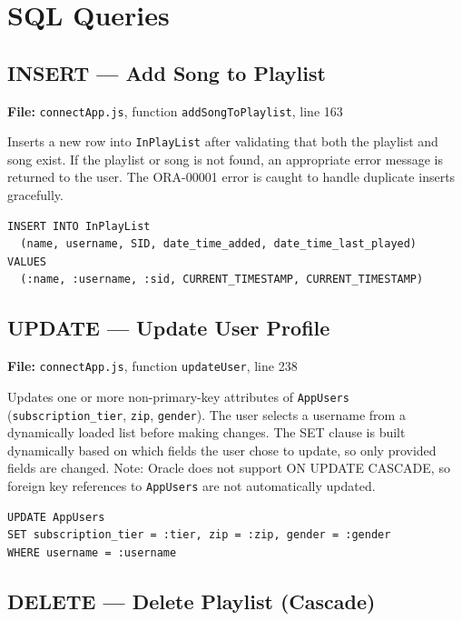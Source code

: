 \documentclass{article}
\begin{document}
\section{SQL Queries}

\subsection{INSERT --- Add Song to Playlist}

\textbf{File:} \texttt{connectApp.js}, function \texttt{addSongToPlaylist}, line 163

Inserts a new row into \texttt{InPlayList} after validating that both the
playlist and song exist. If the playlist or song is not found, an appropriate
error message is returned to the user. The ORA-00001 error is caught to handle
duplicate inserts gracefully.

\begin{lstlisting}
INSERT INTO InPlayList
  (name, username, SID, date_time_added, date_time_last_played)
VALUES
  (:name, :username, :sid, CURRENT_TIMESTAMP, CURRENT_TIMESTAMP)
\end{lstlisting}

\subsection{UPDATE --- Update User Profile}

\textbf{File:} \texttt{connectApp.js}, function \texttt{updateUser}, line 238

Updates one or more non-primary-key attributes of \texttt{AppUsers}
(\texttt{subscription\_tier}, \texttt{zip}, \texttt{gender}). The user selects
a username from a dynamically loaded list before making changes. The SET clause
is built dynamically based on which fields the user chose to update, so only
provided fields are changed. Note: Oracle does not support ON UPDATE CASCADE,
so foreign key references to \texttt{AppUsers} are not automatically updated.

\begin{lstlisting}
UPDATE AppUsers
SET subscription_tier = :tier, zip = :zip, gender = :gender
WHERE username = :username
\end{lstlisting}

\subsection{DELETE --- Delete Playlist (Cascade)}
\end{document}
